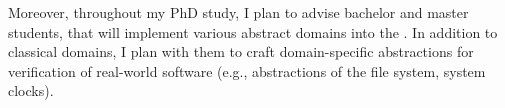 \prule
\bigskip

\noindent
Moreover, throughout my PhD study, I plan to advise bachelor and master
students, that will implement various abstract domains into the \lart. In
addition to classical domains, I plan with them to craft domain-specific abstractions
for verification of real-world software (e.g., abstractions of the file system,
system clocks).
